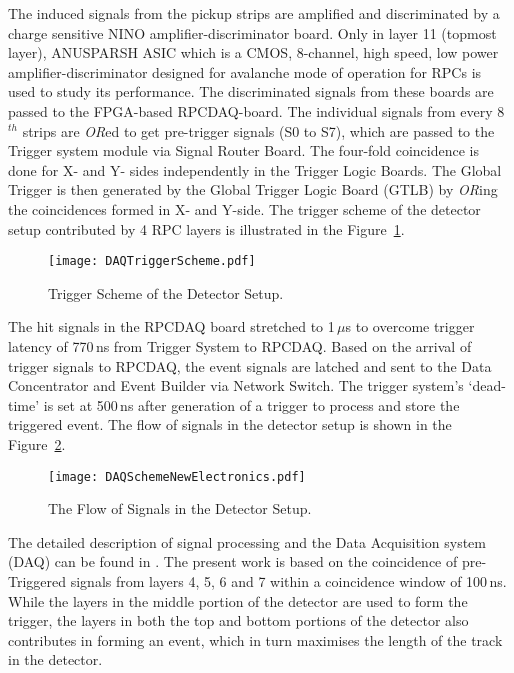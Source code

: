 The induced signals from the pickup strips are amplified and
discriminated by a charge sensitive NINO\cite{nino}
amplifier-discriminator board. Only in layer 11 (topmost layer),
ANUSPARSH ASIC\cite{anusp} which is a CMOS, 8-channel,
high speed, low power amplifier-discriminator designed for
avalanche mode of operation for RPCs is used to study its performance.
The discriminated signals from these boards are passed
to the FPGA-based RPCDAQ-board.
The individual signals from every 8$^{th}$ strips are \emph{OR}ed
to get pre-trigger signals (S0 to S7), which are passed to the Trigger
system module via Signal Router Board. The four-fold coincidence is done
for X- and Y- sides independently in the Trigger Logic Boards.
The Global Trigger is then generated by the Global Trigger Logic Board
(GTLB) by \textit{OR}ing the coincidences formed in X- and Y-side.
The trigger scheme of the detector setup contributed by 4 RPC layers is
illustrated in the Figure~\ref{fig:trigger}.
\begin{figure}[h]
  \texttt{[image: DAQTriggerScheme.pdf]} 
  \caption{Trigger Scheme of the Detector Setup.}
  \label{fig:trigger}
\end{figure}

The hit signals in the RPCDAQ board
stretched to 1\,$\mu$s to overcome trigger latency of 770\,ns from
Trigger System to RPCDAQ. Based on the arrival of trigger signals to
RPCDAQ, the event signals are latched and sent to the Data Concentrator
and Event Builder via Network Switch. The trigger system's `dead-time'
is set at 500\,ns after generation of a trigger to process and store
the triggered event.
The flow of signals in the detector setup is shown in the
Figure~\ref{fig:sigflow}.
\begin{figure}[h]
  \texttt{[image: DAQSchemeNewElectronics.pdf]} 
  \caption{The Flow of Signals in the Detector Setup.}
  \label{fig:sigflow}
\end{figure}
The detailed description of signal processing and the Data Acquisition
system (DAQ) can be found in \cite{elec1}. The present work is based
on the coincidence of pre-Triggered signals from layers 4, 5, 6 and 7
within a coincidence window of 100\,ns. While the layers in the middle
portion of the detector are used to form the trigger, the layers in
both the top and bottom portions of the detector also contributes in
forming an event, which in turn maximises the length of the track in
the detector.

